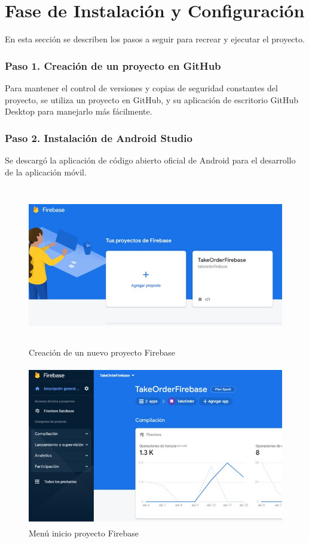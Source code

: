 \section{Fase de Instalación y Configuración}
En esta sección se describen los pasos a seguir para recrear y ejecutar el proyecto.
\subsubsection*{Paso 1. Creación de un proyecto en GitHub}
Para mantener el control de versiones y copias de seguridad constantes del proyecto, se utiliza un proyecto en GitHub, y su aplicación de escritorio GitHub Desktop para manejarlo más fácilmente.


\subsubsection*{Paso 2. Instalación de Android Studio}
Se descargó la aplicación de código abierto oficial de Android para el desarrollo de la aplicación móvil.

\begin{figure}[h]
    \centering
    \includegraphics[width=13cm, height=7cm]{Imagenes/Figuras/FirebaseCrearProyecto.jpg} 
   \caption{Creación de un nuevo proyecto Firebase\label{fig:Firea}}
\end{figure}

\begin{figure}[h]
    \centering
\includegraphics[width=13cm, height=7cm]{Imagenes/Figuras/FirebaseMuestraProyecto.jpg} 
   \caption{Menú inicio proyecto Firebase\label{fig:Fireb}}
\end{figure}

